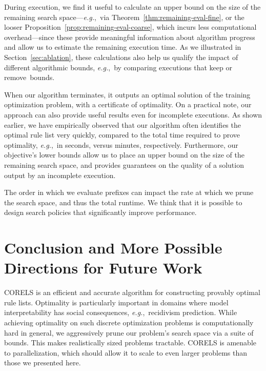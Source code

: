 \documentclass[twoside,11pt]{article}
\def\eg{{\it e.g.},~}
\begin{document}
\begin{arxiv}
During execution, we find it useful to calculate an upper bound on the
size of the remaining search space---\eg via Theorem~\ref{thm:remaining-eval-fine},
or the looser Proposition~\ref{prop:remaining-eval-coarse}, which incurs less
computational overhead---since these provide meaningful information about algorithm
progress and allow us to estimate the remaining execution time.
%
As we illustrated in Section~\ref{sec:ablation},
these calculations also help us qualify the impact of different algorithmic bounds,
\eg by comparing executions that keep or remove~bounds.

When our algorithm terminates, it outputs an optimal solution of the training optimization problem, with a certificate of optimality.
%
On a practical note, our approach can also provide useful results even for incomplete executions.
%
As shown earlier, we have empirically observed that our algorithm often identifies the optimal rule list
very quickly, compared to the total time required to prove optimality, \eg in seconds,
versus minutes, respectively.
%
Furthermore, our objective's lower bounds allow us to place an upper bound on the size of the remaining search space,
and provides guarantees on the quality of a solution output by an incomplete execution.

The order in which we evaluate prefixes can impact the rate at which we
prune the search space, and thus the total runtime. We think that it is possible to design search policies that significantly improve performance.

\end{arxiv}

\section{Conclusion and More Possible Directions for Future Work}

\begin{kdd}
CORELS is an efficient and accurate algorithm for constructing provably optimal rule lists.
%
Optimality is particularly important in domains where model interpretability
has social consequences, \eg recidivism prediction.
%
While achieving optimality on such discrete optimization problems is
computationally hard in general, we aggressively prune our problem's search space
via a suite of bounds.
%
This makes realistically sized problems tractable.
%
CORELS is amenable to parallelization, which should allow it to scale to
even larger problems than those we presented here.
\end{kdd}
\end{document}
